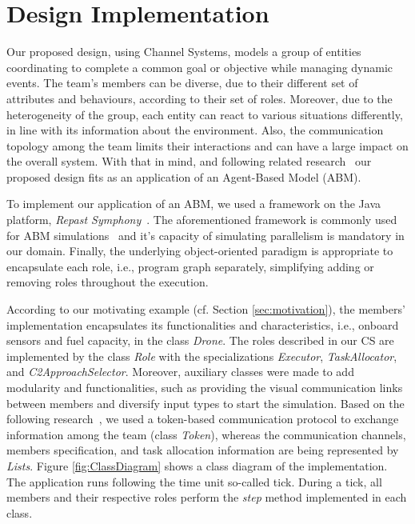 \newpage
\section{Design Implementation}
\label{sec:design}

Our proposed design, using Channel Systems, models a group of entities coordinating to complete a common goal or objective while managing dynamic events. The team's members can be diverse, due to their different set of attributes and behaviours, according to their set of roles. Moreover, due to the heterogeneity of the group, each entity can react to various situations differently, in line with its information about the environment. Also, the communication topology among the team limits their interactions and can have a large impact on the overall system. With that in mind, and following related research~\cite{evaluating} our proposed design fits as an application of an Agent-Based Model (ABM). 

To implement our application of an ABM, we used a framework on the Java platform, \textit{Repast Symphony}~\cite{repastDoc}. The aforementioned framework is commonly used for ABM simulations~\cite{repast} and it's capacity of simulating parallelism is mandatory in our domain. Finally, the underlying object-oriented paradigm is appropriate to encapsulate each role, i.e., program graph separately, simplifying adding or removing roles throughout the execution.

According to our motivating example (cf. Section \ref{sec:motivation}), the members' implementation encapsulates its functionalities and characteristics, i.e., onboard sensors and fuel capacity, in the class \textit{Drone}. The roles described in our CS are implemented by the class \textit{Role} with the specializations \textit{Executor}, \textit{TaskAllocator}, and \textit{C2ApproachSelector}. Moreover, auxiliary classes were made to add modularity and functionalities, such as providing the visual communication links between members and diversify input types to start the simulation. Based on the following research~\cite{swarmGap}, we used a token-based communication protocol to exchange information among the team (class \textit{Token}), whereas the communication channels, members specification, and task allocation information are being represented by \textit{Lists}. Figure \ref{fig:ClassDiagram} shows a class diagram of the implementation. The application runs following the time unit so-called tick. During a tick, all members and their respective roles perform the \textit{step} method implemented in each class.

